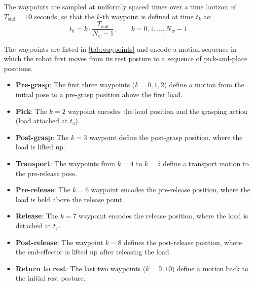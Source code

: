 The waypoints are sampled at uniformly spaced times over a time horizon of $T_{\text{end}} = 10$ seconds, so that the $k$-th waypoint is defined at time $t_k$ as:
\begin{equation}
  t_k = k \cdot \frac{T_{\text{end}}}{N_w - 1}, \qquad k = 0, 1, \ldots, N_w - 1
\end{equation}

The waypoints are listed in \cref{tab:waypoints} and encode a motion sequence in which the robot first moves from its rest posture to a sequence of pick-and-place positions.

\begin{itemize}
    \item \textbf{Pre-grasp}: The first three waypoints ($k=0,1,2$) define a motion from the initial pose to a pre-grasp position above the first load.
    \item \textbf{Pick}: The $k=2$ waypoint encodes the load position and the grasping action (load attached at $t_3$).
    \item \textbf{Post-grasp}: The $k=3$ waypoint define the post-grasp position, where the load is lifted up.
    \item \textbf{Transport}: The waypoints from $k=4$ to $k=5$ define a transport motion to the pre-release pose.
    \item \textbf{Pre-release}: The $k=6$ waypoint encodes the pre-release position, where the load is held above the release point.
    \item \textbf{Release}: The $k=7$ waypoint encodes the release position, where the load is detached at $t_7$.
    \item \textbf{Post-release}: The waypoint $k=8$ defines the post-release position, where the end-effector is lifted up after releasing the load.
    \item \textbf{Return to rest}: The last two waypoints ($k=9,10$) define a motion back to the initial rest posture.
\end{itemize}

